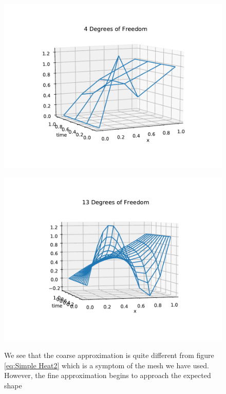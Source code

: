 \documentclass{uonmathreport}
\theoremstyle{definition}
\theoremstyle{problem}
\theoremstyle{theorem}
\begin{document}
\begin{figure}
\caption{We see that the coarse approximation is quite different from figure \ref{eq:Simple Heat2} which is a symptom of the mesh we have used. However, the fine approximation begins to approach the expected shape}
\begin{minipage}{0.49\hsize}
   \includegraphics[width=1.2\textwidth]{CAMQ2delta_t_nCoarse.pdf}
  \end{minipage}
    \begin{minipage}{0.49\hsize}
    \vspace{5mm}
    \includegraphics[width=1.2\textwidth]{CAMQ2delta_t_nFine.pdf}
  \label{fig:c}
\end{minipage}
    \end{figure}
    
\end{document}

